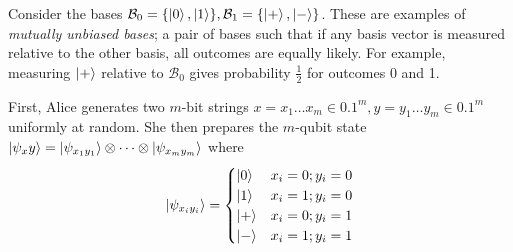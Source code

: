 Consider the bases \( \mathcal B_0 = \qty{\ket{0}, \ket{1}}, \mathcal B_1 = \qty{\ket{+}, \ket{-}} \).
These are examples of \emph{mutually unbiased bases}; a pair of bases such that if any basis vector is measured relative to the other basis, all outcomes are equally likely.
For example, measuring \( \ket{+} \) relative to \( \mathcal B_0 \) gives probability \( \frac{1}{2} \) for outcomes 0 and 1.

First, Alice generates two \( m \)-bit strings \( x = x_1 \dots x_m \in \qty{0,1}^m, y = y_1 \dots y_m \in \qty{0,1}^m \) uniformly at random.
She then prepares the \( m \)-qubit state \( \ket{\psi_xy} = \ket{\psi_{x_1 y_1}} \otimes \dots \otimes \ket{\psi_{x_m y_m}} \) where
\[ \ket{\psi_{x_i y_i}} = \begin{cases}
    \ket{0} & x_i = 0; y_i = 0 \\
    \ket{1} & x_i = 1; y_i = 0 \\
    \ket{+} & x_i = 0; y_i = 1 \\
    \ket{-} & x_i = 1; y_i = 1
\end{cases} \]
